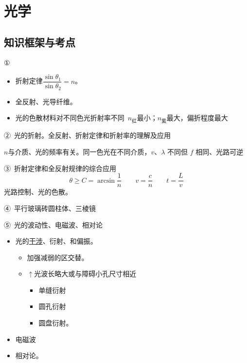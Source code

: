 \chapter{光学}
\label{ch:15}

\section{知识框架与考点}
①
\begin{itemize}
\item 折射定律\quad $\dfrac{\sin\theta_1}{\sin\theta_2}=n$。
\item 全反射、光导纤维。
\item 光的色散\quad 材料对不同色光折射率不同\ $n_{\text{红}}$最小；$n_{\text{紫}}$最大，偏折程度最大
\end{itemize}

②\ 光的折射。全反射、折射定律和折射率的理解及应用

$n$与介质、光的频率有关。同一色光在不同介质，$v$、$\lambda$ 不同但 $f$ 相同、光路可逆

③\ 折射定律和全反射规律的综合应用
\[ \theta\ge C=\arcsin\frac{1}{n}\qquad v=\frac{c}{n}\qquad t=\frac{L}{v} \]
光路控制、光的色散。

④\ 平行玻璃砖\quad 圆柱体、三棱镜

⑤\ 光的波动性、电磁波、相对论
\begin{itemize}
\item 光的\uline{干涉}、衍射、和偏振。
  \begin{itemize}
  \item 加强减弱的区交替。
  \item $\uparrow$光波长略大或与障碍小孔尺寸相近
    \begin{itemize}
    \item 单缝衍射
    \item 圆孔衍射
    \item 圆盘衍射。
    \end{itemize}
  \end{itemize}
\item 电磁波
\item 相对论。
\end{itemize}

